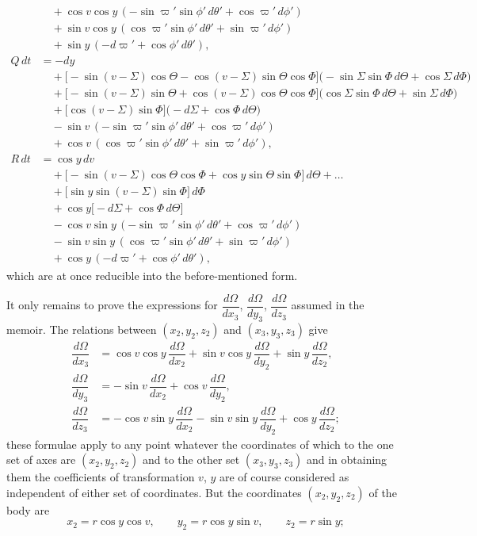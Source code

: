 \documentclass[12pt,a4paper]{article}
\theoremstyle{plain}
\begin{document}
\newpage
{}
\begin{align*}
&\quad +\cos v\cos y\,(-\sin\varpi'\sin\phi'\,d\theta'+\cos\varpi'\,d\phi')\\
&\quad +\sin v\cos y\,(\cos\varpi'\sin\phi'\,d\theta'+\sin\varpi'\,d\phi')\\
&\quad +\sin y\,(-d\varpi'+\cos\phi'\,d\theta'),\\[0.5em]
Q\,dt &= -dy\\
&\quad +\bigl[-\sin(v-\varSigma)\cos\Theta-\cos(v-\varSigma)\sin\Theta\cos\varPhi\bigr]\bigl(-\sin\varSigma\sin\varPhi\,d\Theta+\cos\varSigma\,d\varPhi\bigr)\\
&\quad +\bigl[-\sin(v-\varSigma)\sin\Theta+\cos(v-\varSigma)\cos\Theta\cos\varPhi\bigr]\bigl(\cos\varSigma\sin\varPhi\,d\Theta+\sin\varSigma\,d\varPhi\bigr)\\
&\quad +\bigl[\cos(v-\varSigma)\sin\varPhi\bigr]\bigl(-d\varSigma+\cos\varPhi\,d\Theta\bigr)\\
&\quad -\sin v\,(-\sin\varpi'\sin\phi'\,d\theta'+\cos\varpi'\,d\phi')\\
&\quad +\cos v\,(\cos\varpi'\sin\phi'\,d\theta'+\sin\varpi'\,d\phi'),\\[0.5em]
R\,dt &= \cos y\,d v\\
&\quad +\bigl[-\sin(v-\varSigma)\cos\Theta\cos\varPhi+\cos y\sin\Theta\sin\varPhi\bigr]\,d\Theta+\ldots\\
&\quad +\bigl[\sin y\sin(v-\varSigma)\sin\varPhi\bigr]\,d\varPhi\\
&\quad +\cos y\bigl[-d\varSigma+\cos\varPhi\,d\Theta\bigr]\\
&\quad -\cos v\sin y\,(-\sin\varpi'\sin\phi'\,d\theta'+\cos\varpi'\,d\phi')\\
&\quad -\sin v\sin y\,(\cos\varpi'\sin\phi'\,d\theta'+\sin\varpi'\,d\phi')\\
&\quad +\cos y\,(-d\varpi'+\cos\phi'\,d\theta'),
\end{align*}
which are at once reducible into the before-mentioned form.

\medskip
It only remains to prove the expressions for $\dfrac{d\Omega}{dx_{3}}$, $\dfrac{d\Omega}{dy_{3}}$, $\dfrac{d\Omega}{dz_{3}}$ assumed in the memoir. The relations between $(x_{2},y_{2},z_{2})$ and $(x_{3},y_{3},z_{3})$ give
\begin{align*}
\dfrac{d\Omega}{dx_{3}} &= \cos v\cos y\,\dfrac{d\Omega}{dx_{2}}+\sin v\cos y\,\dfrac{d\Omega}{dy_{2}}+\sin y\,\dfrac{d\Omega}{dz_{2}},\\
\dfrac{d\Omega}{dy_{3}} &= -\sin v\,\dfrac{d\Omega}{dx_{2}}+\cos v\,\dfrac{d\Omega}{dy_{2}},\\
\dfrac{d\Omega}{dz_{3}} &= -\cos v\sin y\,\dfrac{d\Omega}{dx_{2}}-\sin v\sin y\,\dfrac{d\Omega}{dy_{2}}+\cos y\,\dfrac{d\Omega}{dz_{2}};
\end{align*}
these formulae apply to any point whatever the coordinates of which to the one set of axes are $(x_{2},y_{2},z_{2})$ and to the other set $(x_{3},y_{3},z_{3})$ and in obtaining them the coefficients of transformation $v$, $y$ are of course considered as independent of either set of coordinates. But the coordinates $(x_{2},y_{2},z_{2})$ of the body are
\[
x_{2}=r\cos y\cos v,\qquad y_{2}=r\cos y\sin v,\qquad z_{2}=r\sin y;
\]
\end{document}
